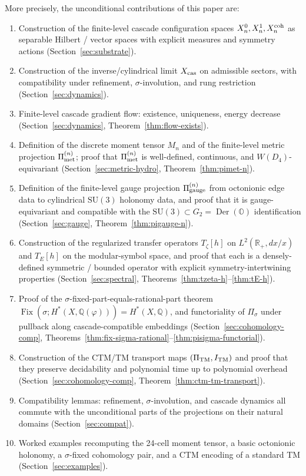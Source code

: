 \documentclass[11pt, a4paper]{amsart}
\theoremstyle{definition}
\newcommand{\R}{\mathbb{R}}
\newcommand{\Q}{\mathbb{Q}}
\newcommand{\OO}{\mathbb{O}}
\newcommand{\pphi}{\varphi}
\newcommand{\cas}{{\rm cas}}
\newcommand{\met}{{\rm met}}
\newcommand{\gge}{{\rm gauge}}
\newcommand{\co}{{\rm coh}}
\newcommand{\TM}{{\rm TM}}
\newcommand{\Fix}{\operatorname{Fix}}
\newcommand{\Der}{\operatorname{Der}}
\begin{document}
More precisely, the unconditional contributions of this paper are:
\begin{enumerate}[label=(U\arabic*)]
\item Construction of the finite-level cascade configuration spaces
  $X_n^0, X_n^1, X_n^{\co}$ as separable Hilbert / vector spaces with
  explicit measures and symmetry actions (Section~\ref{sec:substrate}).
\item Construction of the inverse/cylindrical limit
  $X_\cas$ on admissible sectors, with compatibility under
  refinement, $\sigma$-involution, and rung restriction
  (Section~\ref{sec:dynamics}).
\item Finite-level cascade gradient flow: existence, uniqueness,
  energy decrease (Section~\ref{sec:dynamics}, Theorem~\ref{thm:flow-exists}).
\item Definition of the discrete moment tensor $M_n$ and of the
  finite-level metric projection $\Pi_{\met}^{(n)}$; proof that
  $\Pi_{\met}^{(n)}$ is well-defined, continuous, and
  $W(D_4)$-equivariant (Section~\ref{sec:metric-hydro},
  Theorem~\ref{thm:pimet-n}).
\item Definition of the finite-level gauge projection
  $\Pi_{\gge}^{(n)}$ from octonionic edge data to cylindrical
  $\mathrm{SU}(3)$ holonomy data, and proof that it is
  gauge-equivariant and compatible with the $\mathrm{SU}(3) \subset
  G_2 = \Der(\OO)$ identification (Section~\ref{sec:gauge},
  Theorem~\ref{thm:pigauge-n}).
\item Construction of the regularized transfer operators
  $T_\zeta[h]$ on $L^2(\R_+, dx/x)$ and $T_E[h]$ on the
  modular-symbol space, and proof that each is a densely-defined
  symmetric / bounded operator with explicit
  symmetry-intertwining properties (Section~\ref{sec:spectral},
  Theorems~\ref{thm:tzeta-h}--\ref{thm:tE-h}).
\item Proof of the $\sigma$-fixed-part-equals-rational-part theorem
  $\Fix(\sigma; H^*(X, \Q(\pphi))) = H^*(X, \Q)$, and
  functoriality of $\Pi_\sigma$ under pullback along cascade-compatible
  embeddings (Section~\ref{sec:cohomology-comp},
  Theorems~\ref{thm:fix-sigma-rational}--\ref{thm:pisigma-functorial}).
\item Construction of the CTM/TM transport maps
  $(\Pi_{\TM}, I_{\TM})$ and proof that they preserve decidability
  and polynomial time up to polynomial overhead
  (Section~\ref{sec:cohomology-comp}, Theorem~\ref{thm:ctm-tm-transport}).
\item Compatibility lemmas: refinement, $\sigma$-involution, and
  cascade dynamics all commute with the unconditional parts of the
  projections on their natural domains (Section~\ref{sec:compat}).
\item Worked examples recomputing the 24-cell moment tensor, a
  basic octonionic holonomy, a $\sigma$-fixed cohomology pair, and
  a CTM encoding of a standard TM
  (Section~\ref{sec:examples}).
\end{enumerate}
\end{document}
